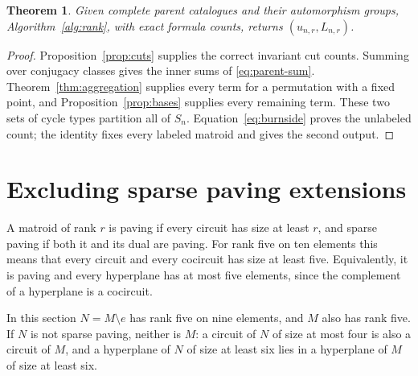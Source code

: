 \documentclass[11pt]{article}
\newtheorem{theorem}{Theorem}[section]
\theoremstyle{definition}
\begin{document}
\begin{theorem}\label{thm:rank}
Given complete parent catalogues and their automorphism groups,
Algorithm~\ref{alg:rank}, with exact formula counts, returns $(u_{n,r},L_{n,r})$.
\end{theorem}
\begin{proof}
Proposition~\ref{prop:cuts} supplies the correct invariant cut counts.
Summing over conjugacy classes gives the inner sums of
\eqref{eq:parent-sum}. Theorem~\ref{thm:aggregation} supplies every
term for a permutation with a fixed point, and Proposition~\ref{prop:bases} supplies every remaining
term. These two sets of cycle types partition all of $S_n$.
Equation~\eqref{eq:burnside} proves the unlabeled count; the identity fixes
every labeled matroid and gives the second output.
\end{proof}

\section{Excluding sparse paving extensions}\label{sec:nonsp}

A matroid of rank $r$ is paving if every circuit has size at least $r$, and
sparse paving if both it and its dual are paving. For rank five on ten
elements this means that every circuit and every cocircuit has size
at least five. Equivalently, it is paving and every hyperplane has at most
five elements, since the complement of a hyperplane is a cocircuit.

In this section $N=M\setminus e$ has rank five on nine elements, and $M$
also has rank five. If $N$ is not sparse paving, neither is $M$: a circuit
of $N$ of size at most four is also a circuit of $M$, and a hyperplane of
$N$ of size at least six lies in a hyperplane of $M$ of size at least six.
\end{document}
